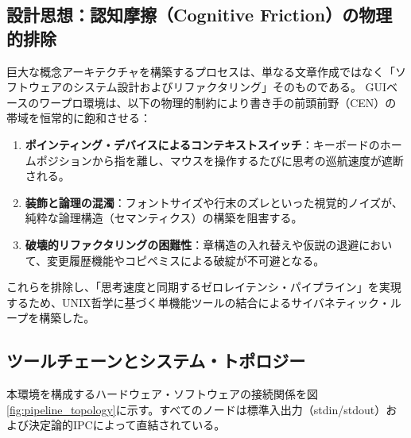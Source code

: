 \subsection{設計思想：認知摩擦（Cognitive Friction）の物理的排除}
巨大な概念アーキテクチャを構築するプロセスは、単なる文章作成ではなく「ソフトウェアのシステム設計およびリファクタリング」そのものである。
GUIベースのワープロ環境は、以下の物理的制約により書き手の前頭前野（CEN）の帯域を恒常的に飽和させる：
\begin{enumerate}
    \item \textbf{ポインティング・デバイスによるコンテキストスイッチ}：キーボードのホームポジションから指を離し、マウスを操作するたびに思考の巡航速度が遮断される。
    \item \textbf{装飾と論理の混濁}：フォントサイズや行末のズレといった視覚的ノイズが、純粋な論理構造（セマンティクス）の構築を阻害する。
    \item \textbf{破壊的リファクタリングの困難性}：章構造の入れ替えや仮説の退避において、変更履歴機能やコピペミスによる破綻が不可避となる。
\end{enumerate}

これらを排除し、「思考速度と同期するゼロレイテンシ・パイプライン」を実現するため、UNIX哲学に基づく単機能ツールの結合によるサイバネティック・ループを構築した。

\subsection{ツールチェーンとシステム・トポロジー}
本環境を構成するハードウェア・ソフトウェアの接続関係を図\ref{fig:pipeline_topology}に示す。すべてのノードは標準入出力（stdin/stdout）および決定論的IPCによって直結されている。

